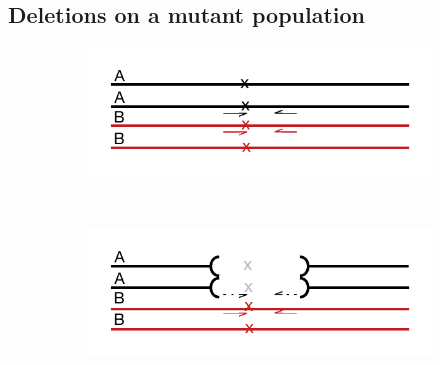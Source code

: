\subsection{Deletions on a mutant population}

\begin{figure}
    \centering
    \begin{subfigure}[b]{0.45\textwidth}
        \includegraphics[width=1\textwidth]{PolyMarker/Figures/deletions/wt.pdf}
        \caption{}
        \label{fig:poly:wt}
    \end{subfigure}
    ~
     \begin{subfigure}[b]{0.45\textwidth}
        \includegraphics[width=1\textwidth]{PolyMarker/Figures/deletions/homM4.pdf}
        \caption{}
        \label{fig:poly:homM4}
    \end{subfigure}
    \begin{subfigure}[b]{0.3\textwidth}

\end{subfigure}
\end{figure}
